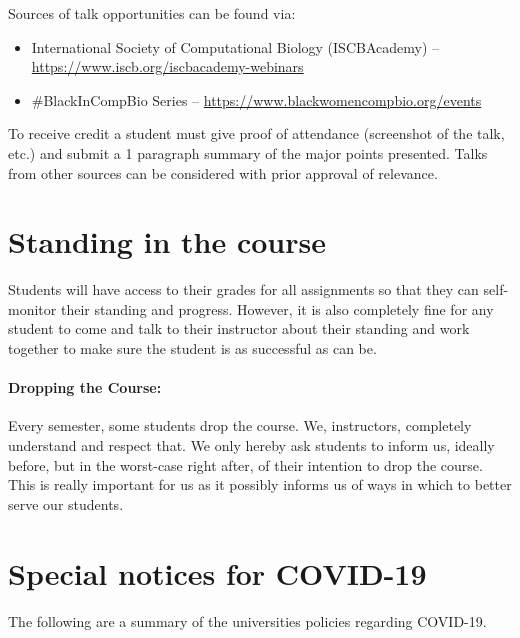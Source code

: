 \documentclass[12pt]{scrartcl}
\begin{document}
Sources of talk opportunities can be found via: 
\begin{itemize}
\item International Society of Computational Biology (ISCBAcademy) -- \\\url{https://www.iscb.org/iscbacademy-webinars}
\item \#BlackInCompBio Series -- \url{https://www.blackwomencompbio.org/events}
\end{itemize}
To receive credit a student must give proof of attendance (screenshot of the talk, etc.) and submit a 1 paragraph summary of the major points presented. 
Talks from other sources can be considered with prior approval of relevance. 

\section{Standing in the course}

Students will have access to their grades for all assignments so that they can self-monitor their standing and progress. 
However, it is also completely fine for any student to come and talk to their instructor about their standing and work together to make sure the student is as successful as can be.

\paragraph{Dropping the Course:} 
Every semester, some students drop the course. We, instructors, completely understand and respect that. We only hereby ask students to inform us, ideally before, but in the worst-case right after, of their intention to drop the course. This is really important for us as it possibly informs us of ways in which to better serve our students.


\section{Special notices for COVID-19}

The following are a summary of the universities policies regarding COVID-19.
\end{document}
